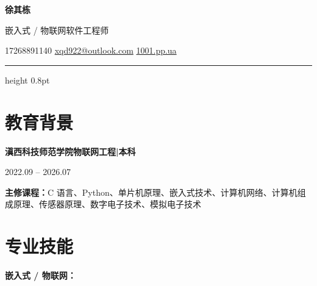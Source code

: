 \documentclass[10pt,a4paper]{article}
\begin{document}
\begin{center}
    {\fontsize{24}{28}\selectfont\bfseries\color{primary} 徐其栋}

    \vspace{0.12em}

    {\color{primary}\small 嵌入式 / 物联网软件工程师}

    \vspace{0.25em}

    {\color{graytext}
    \faPhone\hspace{0.3em}17268891140
    \hspace{1.2em}
    \faEnvelope\hspace{0.3em}\href{mailto:xqd922@outlook.com}{xqd922@outlook.com}
    \hspace{1.2em}
    \faGlobe\hspace{0.3em}\href{https://1001.pp.ua}{1001.pp.ua}}

\end{center}

\vspace{0.2em}
{\color{rulecolor}\hrule height 0.8pt}

\section{\faGraduationCap\hspace{0.4em}教育背景}

{\bfseries 滇西科技师范学院}\hfill{\bfseries 物联网工程\hspace{0.3em}|\hspace{0.3em}本科}

{\color{graytext} 2022.09 -- 2026.07}

\vspace{0.2em}

{\color{darktext}\textbf{主修课程：}C 语言、Python、单片机原理、嵌入式技术、计算机网络、计算机组成原理、传感器原理、数字电子技术、模拟电子技术}

\section{\faCogs\hspace{0.4em}专业技能}

{\bfseries\color{primary}嵌入式 / 物联网：}
\end{document}
